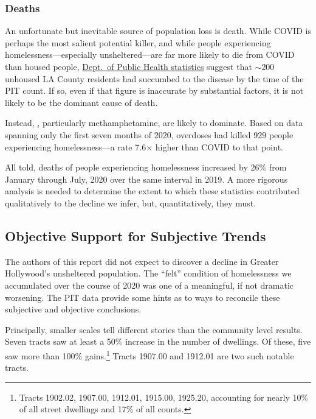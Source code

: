 \documentclass[11pt,twocolumn]{article}
\begin{document}
\subsubsection{Deaths}

An unfortunate but inevitable source of population loss is death. While COVID is perhaps the most salient potential killer,
and while people experiencing homelessness---especially unsheltered---are far more likely to die from COVID than housed
people, \href{http://publichealth.lacounty.gov/media/coronavirus/docs/SummaryReport_People_Experiencing_Homelessness.pdf}
{Dept.\ of Public Health statistics} suggest that $\sim$200 unhoused LA County residents had succumbed to the 
disease by the time of the PIT count. If so, even if that figure is inaccurate by substantial factors, it is not likely to be the
dominant cause of death.

Instead, \href{http://publichealth.lacounty.gov/chie/reports/HomelessMortality2020_CHIEBrief_Final.pdf}, particularly methamphetamine, are likely to dominate. Based on data spanning only the first seven months of 2020, overdoses had
killed 929 people experiencing homelessness---a rate 7.6$\times$ higher than COVID to that point.

All told, deaths of people experiencing homelessness increased by 26\% from January through July, 2020 over the same
interval in 2019. A more rigorous analysis is needed to determine the extent to which these statistics contributed 
qualitatively to the decline we infer, but, quantitatively, they must.

\subsection{Objective Support for Subjective Trends}

The authors of this report did not expect to discover a decline in Greater Hollywood's unsheltered population.
The ``felt'' condition of homelessness we accumulated over the course of 2020 was one of a meaningful,
if not dramatic worsening. The PIT data provide some hints as to ways to reconcile these subjective and 
objective conclusions.

Principally, smaller scales tell different stories than the community level results. Seven tracts saw at least a 
50\% increase in the number of dwellings. Of these, five saw more than 100\% gains.\footnote{Tracts 1902.02, 
1907.00, 1912.01, 1915.00, 1925.20, accounting for nearly 10\% of all street dwellings and 17\% of all counts.} 
Tracts 1907.00 and 1912.01 are two such notable tracts.
\end{document}
